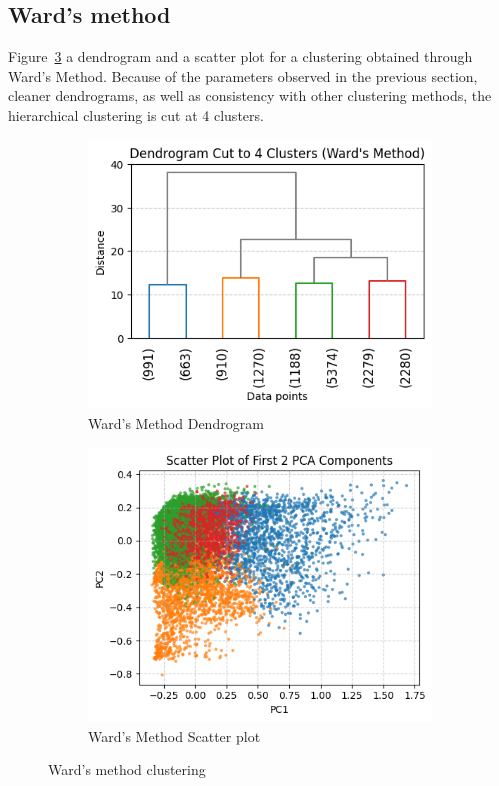 \subsection{Ward's method}
Figure~\ref{fig:dendrograms_ward} a dendrogram and a scatter plot for a clustering obtained through
Ward's Method. Because of the parameters observed in the previous section, cleaner dendrograms,
as well as consistency with other clustering methods, the hierarchical clustering is cut at 4 clusters.
\begin{figure}[H]
    \centering
    \begin{subfigure}[b]{0.49\textwidth}
        \centering
        \includegraphics[width=\textwidth]{plots/dendrogram_4.png}
        \caption{Ward's Method Dendrogram}
        \label{fig:dendrogram_ward}
    \end{subfigure}
    \begin{subfigure}[b]{0.49\textwidth}
        \centering
        \includegraphics[width=\textwidth]{plots/scatter_ward.png}
        \caption{Ward's Method Scatter plot}
        \label{fig:scatter_ward}
    \end{subfigure}
    \caption{Ward's method clustering}
    \label{fig:dendrograms_ward}
\end{figure}

